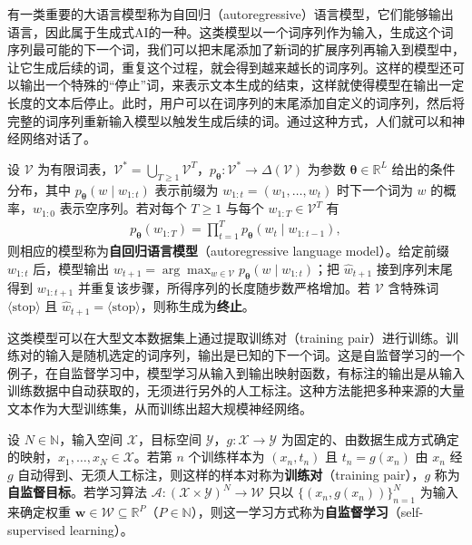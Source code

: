 \documentclass[../../main.tex]{subfiles}
\begin{document}
有一类重要的大语言模型称为自回归（autoregressive）语言模型，它们能够输出语言，因此属于生成式AI的一种。这类模型以一个词序列作为输入，生成这个词序列最可能的下一个词，我们可以把末尾添加了新词的扩展序列再输入到模型中，让它生成后续的词，重复这个过程，就会得到越来越长的词序列。这样的模型还可以输出一个特殊的“停止”词，来表示文本生成的结束，这样就使得模型在输出一定长度的文本后停止。此时，用户可以在词序列的末尾添加自定义的词序列，然后将完整的词序列重新输入模型以触发生成后续的词。通过这种方式，人们就可以和神经网络对话了。

\begin{definition}[自回归语言模型]\label{definition:ch01-自回归语言模型}
设 $\mathcal{V}$ 为有限词表，$\mathcal{V}^{*}=\bigcup_{T\geqslant1}\mathcal{V}^{T}$，$p_{\boldsymbol{\theta}}:\mathcal{V}^{*}\to\Delta(\mathcal{V})$ 为参数 $\boldsymbol{\theta}\in\mathbb{R}^{L}$ 给出的条件分布，其中 $p_{\boldsymbol{\theta}}(w\mid w_{1:t})$ 表示前缀为 $w_{1:t}=(w_{1},\dots,w_{t})$ 时下一个词为 $w$ 的概率，$w_{1:0}$ 表示空序列。若对每个 $T\geqslant1$ 与每个 $w_{1:T}\in\mathcal{V}^{T}$ 有
\begin{align*}
  p_{\boldsymbol{\theta}}(w_{1:T})=\prod_{t=1}^{T}p_{\boldsymbol{\theta}}(w_{t}\mid w_{1:t-1}),
\end{align*}
则相应的模型称为\textbf{自回归语言模型}（autoregressive language model）。给定前缀 $w_{1:t}$ 后，模型输出 $\hat{w}_{t+1}=\arg\max_{w\in\mathcal{V}}p_{\boldsymbol{\theta}}(w\mid w_{1:t})$；把 $\hat{w}_{t+1}$ 接到序列末尾得到 $w_{1:t+1}$ 并重复该步骤，所得序列的长度随步数严格增加。若 $\mathcal{V}$ 含特殊词 $\langle\mathrm{stop}\rangle$ 且 $\hat{w}_{t+1}=\langle\mathrm{stop}\rangle$，则称生成为\textbf{终止}。
\end{definition}

这类模型可以在大型文本数据集上通过提取训练对（training pair）进行训练。训练对的输入是随机选定的词序列，输出是已知的下一个词。这是自监督学习的一个例子，在自监督学习中，模型学习从输入到输出映射函数，有标注的输出是从输入训练数据中自动获取的，无须进行另外的人工标注。这种方法能把多种来源的大量文本作为大型训练集，从而训练出超大规模神经网络。

\begin{definition}[训练对与自监督学习]\label{definition:ch01-自监督学习}
设 $N\in\mathbb{N}$，输入空间 $\mathcal{X}$，目标空间 $\mathcal{Y}$，$g:\mathcal{X}\to\mathcal{Y}$ 为固定的、由数据生成方式确定的映射，$x_1,\dots,x_N\in\mathcal{X}$。若第 $n$ 个训练样本为 $(x_n,t_n)$ 且 $t_n=g(x_n)$ 由 $x_n$ 经 $g$ 自动得到、无须人工标注，则这样的样本对称为\textbf{训练对}（training pair），$g$ 称为\textbf{自监督目标}。若学习算法 $\mathcal{A}:(\mathcal{X}\times\mathcal{Y})^{N}\to\mathcal{W}$ 只以 $\{(x_n,g(x_n))\}_{n=1}^{N}$ 为输入来确定权重 $\mathbf{w}\in\mathcal{W}\subseteq\mathbb{R}^{P}$（$P\in\mathbb{N}$），则这一学习方式称为\textbf{自监督学习}（self-supervised learning）。
\end{definition}
\end{document}
